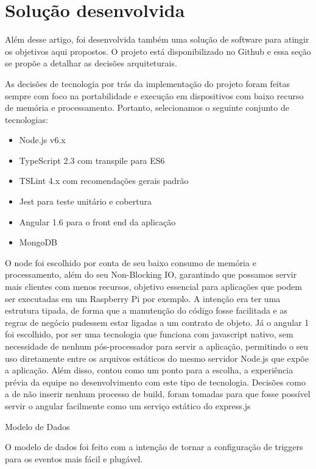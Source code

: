 \section{Solução desenvolvida}
\label{sec:iotGateway}

Além desse artigo, foi desenvolvida também uma solução de software para atingir os objetivos aqui propostos. O projeto está disponibilizado no Github \cite{IoTGatewayGithub} e essa seção se propõe a detalhar as decisões arquiteturais.

As decisões de tecnologia por trás da implementação do projeto foram feitas sempre com foco na portabilidade e execução em dispositivos com baixo recurso de memória e processamento. Portanto, selecionamos o seguinte conjunto de tecnologias:
\begin{itemize}
	\item Node.js v6.x \cite{NodeJS}
	\item TypeScript 2.3 com transpile para ES6 \cite{Typescript}
	\item TSLint 4.x com recomendações gerais padrão \cite{TSLint}
	\item Jest para teste unitário e cobertura \cite{Jest}
	\item Angular 1.6 para o front end da aplicação \cite{AngularJS}
	\item MongoDB \cite{MongoDB}
\end{itemize}

O node foi escolhido por conta de seu baixo consumo de memória e processamento, além do seu Non-Blocking IO, garantindo que possamos servir mais clientes com menos recursos, objetivo essencial para aplicações que podem ser executadas em um Raspberry Pi por exemplo. A intenção era ter uma estrutura tipada, de forma que a manutenção do código fosse facilitada e as regras de negócio pudessem estar ligadas a um contrato de objeto. Já o angular 1 foi escolhido, por ser uma tecnologia que funciona com javascript nativo, sem necessidade de nenhum pós-processador para servir a aplicação, permitindo o seu uso diretamente entre os arquivos estáticos do mesmo servidor Node.js que expõe a aplicação. Além disso, contou como um ponto para a escolha, a experiência prévia da equipe no desenvolvimento com este tipo de tecnologia. Decisões como a de não inserir nenhum processo de build, foram tomadas para que fosse possível servir o angular facilmente como um serviço estático do express.js

Modelo de Dados

O modelo de dados foi feito com a intenção de tornar a configuração de triggers para os eventos mais fácil e plugável. 

